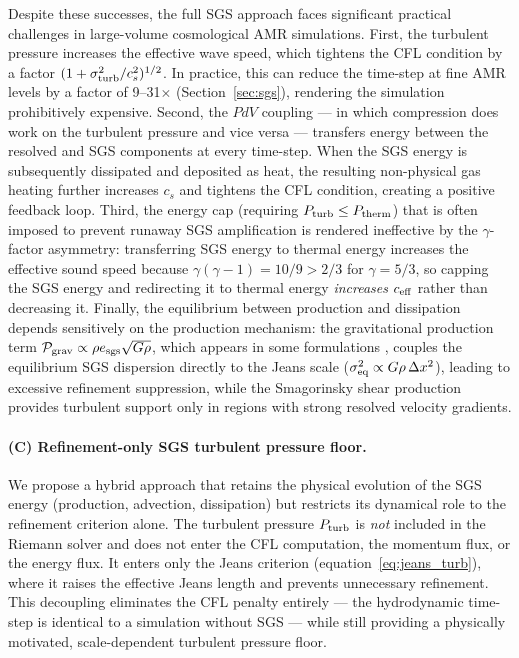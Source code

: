 \documentclass[fleqn,usenatbib]{mnras}
\begin{document}
Despite these successes, the full SGS approach faces significant
practical challenges in large-volume cosmological AMR simulations.
First, the turbulent pressure increases the effective wave speed,
which tightens the CFL condition by a factor
$(1 + \sigma_{\rm turb}^2/c_s^2)^{1/2}$.  In practice, this can
reduce the time-step at fine AMR levels by a factor of 9--31$\times$
(Section~\ref{sec:sgs}), rendering the simulation prohibitively
expensive.  Second, the $PdV$ coupling --- in which compression does
work on the turbulent pressure and vice versa --- transfers energy
between the resolved and SGS components at every time-step.  When
the SGS energy is subsequently dissipated and deposited as heat, the
resulting non-physical gas heating further increases $c_s$ and
tightens the CFL condition, creating a positive feedback loop.
Third, the energy cap (requiring $P_{\rm turb} \le P_{\rm therm}$)
that is often imposed to prevent runaway SGS amplification is
rendered ineffective by the $\gamma$-factor asymmetry: transferring
SGS energy to thermal energy increases the effective sound speed
because $\gamma(\gamma-1) = 10/9 > 2/3$ for $\gamma = 5/3$, so
capping the SGS energy and redirecting it to thermal energy
\emph{increases} $c_{\rm eff}$ rather than decreasing it.
Finally, the equilibrium between production and dissipation depends
sensitively on the production mechanism: the gravitational production
term $\mathcal{P}_{\rm grav} \propto \rho e_{\rm sgs}\sqrt{G\rho}$,
which appears in some formulations
\citep[e.g.][]{Scannapieco2008}, couples the equilibrium SGS
dispersion directly to the Jeans scale ($\sigma_{\rm eq}^2 \propto
G\rho\,\Delta x^2$), leading to excessive refinement suppression,
while the Smagorinsky shear production
\citep{Smagorinsky1963, Schmidt2006} provides turbulent support only
in regions with strong resolved velocity gradients.

\paragraph{(C) Refinement-only SGS turbulent pressure floor.}
We propose a hybrid approach that retains the physical evolution of
the SGS energy (production, advection, dissipation) but restricts
its dynamical role to the refinement criterion alone.  The turbulent
pressure $P_{\rm turb}$ is \emph{not} included in the Riemann solver
and does not enter the CFL computation, the momentum flux, or the
energy flux.  It enters only the Jeans criterion
(equation~\ref{eq:jeans_turb}), where it raises the effective Jeans
length and prevents unnecessary refinement.  This decoupling
eliminates the CFL penalty entirely --- the hydrodynamic time-step
is identical to a simulation without SGS --- while still providing
a physically motivated, scale-dependent turbulent pressure floor.
\end{document}
